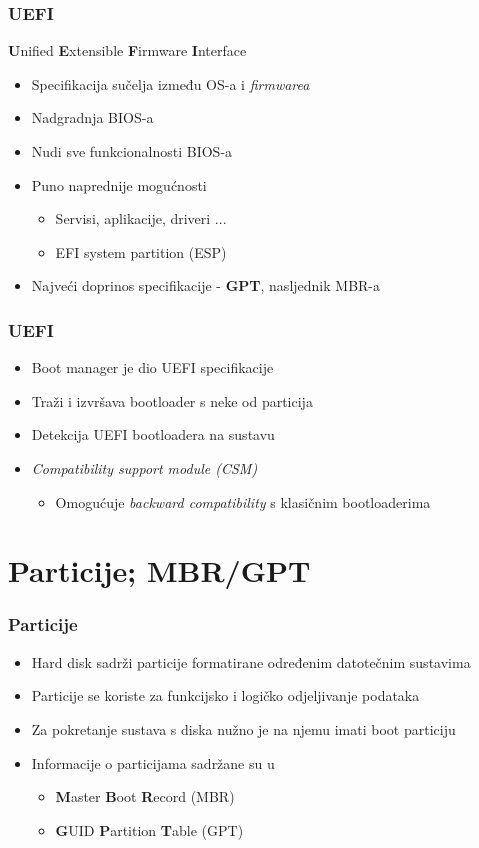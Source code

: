 \documentclass[t]{beamer}
\begin{document}
\begin{frame}
	\frametitle{UEFI}
	\textbf{U}nified \textbf{E}xtensible \textbf{F}irmware \textbf{I}nterface
	\begin{itemize}
		\item Specifikacija sučelja između OS-a i \textit{firmwarea}
		\item Nadgradnja BIOS-a
		\item Nudi sve funkcionalnosti BIOS-a
		\item Puno naprednije mogućnosti
		\begin{itemize}
			\item Servisi, aplikacije, driveri ...
			\item EFI system partition (ESP)
		\end{itemize}
		\item Najveći doprinos specifikacije - \textbf{GPT}, nasljednik MBR-a
	\end{itemize}
\end{frame}

\begin{frame}
	\frametitle{UEFI}
	\begin{itemize}
		\item Boot manager je dio UEFI specifikacije
		\item Traži i izvršava bootloader s neke od particija
		\item Detekcija UEFI bootloadera na sustavu
	\end{itemize}
	\begin{itemize}
		\item \textit{Compatibility support module (CSM)}
		\begin{itemize}
			\item Omogućuje \textit{backward compatibility} s klasičnim bootloaderima
		\end{itemize}
	\end{itemize}
\end{frame}




\section{Particije; MBR/GPT}
\begin{frame}
	\frametitle{Particije}
	\begin{itemize}
		\item Hard disk sadrži particije formatirane određenim datotečnim sustavima
		\item Particije se koriste za funkcijsko i logičko odjeljivanje podataka
		\item Za pokretanje sustava s diska nužno je na njemu imati boot particiju
		\item Informacije o particijama sadržane su u
		\begin{itemize}
			\item \textbf{M}aster \textbf{B}oot \textbf{R}ecord (MBR)
			\item \textbf{G}UID \textbf{P}artition \textbf{T}able (GPT)
		\end{itemize}
	\end{itemize}
\end{frame}	
\end{document}
